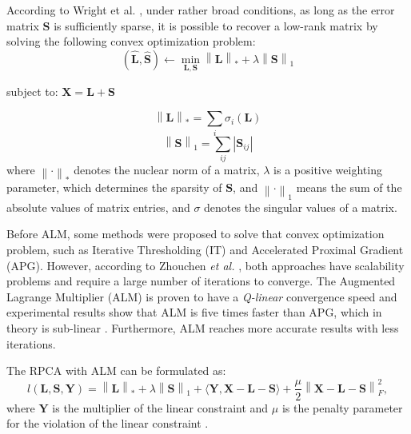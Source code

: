 \documentclass[review]{elsarticle}
\begin{document}
According to Wright et al. \cite{wright2009robust}, under rather broad conditions, as long as the error matrix $\pmb{S}$ is sufficiently sparse, it is possible to recover a low-rank matrix by solving the following convex optimization problem:
\begin{equation}\label{eq:4.01}
	(\hat{\pmb{L}}, \hat{\pmb{S}})\leftarrow \min_{\pmb{L},\pmb{S}}\left \| \pmb{L} \right \|_{*} + \lambda \left \| \pmb{S} \right \|_{1}
\end{equation}
\begin{center} subject to: $\pmb{X} = \pmb{L} + \pmb{S}$ \end{center}
\begin{equation}\label{eq:4.02}
    \left \| \pmb{L} \right \|_{*} = \sum_{i} \sigma_{i}(\pmb{L})
\end{equation}
\begin{equation}\label{eq:4.03}
    \left \| \pmb{S} \right \|_{1} = \sum_{ij} \left | \pmb{S}_{ij} \right |
\end{equation}
where $\left\| \mathord{\cdot} \right\|_*$ denotes the nuclear norm of a matrix, $\lambda$ is a positive weighting parameter, which determines the sparsity of $\pmb{S}$, and $\left\| \mathord{\cdot} \right\|_1$ means the sum of the absolute values of matrix entries, and $\sigma$ denotes the singular values of a matrix. 

Before ALM, some methods were proposed to solve that convex optimization problem, such as Iterative Thresholding (IT) and Accelerated Proximal Gradient (APG). However, according to Zhouchen \emph{et al.} \cite{lin2010augmented}, both approaches have scalability problems and require a large number of iterations to converge. The Augmented Lagrange Multiplier (ALM) is proven to have a \emph{Q-linear} convergence speed and experimental results show that ALM is five times faster than APG, which in theory is sub-linear \cite{lin2010augmented}. Furthermore, ALM reaches more accurate results with less iterations.

The RPCA with ALM can be formulated as:
\begin{equation}\label{eq:4.04}
	l(\pmb{L}, \pmb{S}, \pmb{Y}) = \left\|\pmb{L}\right\|_* + \lambda\left\|\pmb{S}\right\|_1 + \langle \pmb{Y}, \pmb{X} - \pmb{L} - \pmb{S}  \rangle + \frac{\mu}{2}\left\|\pmb{X} - \pmb{L} - \pmb{S}\right\|_F^2,
\end{equation}
where $\pmb{Y}$ is the multiplier of the linear constraint and $\mu$ is the penalty parameter for the violation of the linear constraint \cite{yuan2009sparse}. 
\end{document}
